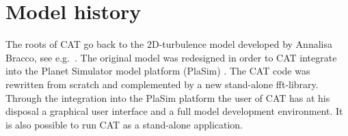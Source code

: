 \chapter{Model history}
The roots of CAT go back to the $2$D-turbulence model developed by
Annalisa Bracco, see e.g.\ \cite{braccoandmcwilliams2010}. The original
model was redesigned in order to CAT integrate into the Planet Simulator 
model platform (PlaSim) \cite{fraedrichetal1998}. The CAT code was 
rewritten from scratch \cite{borthetal2016} and complemented by a 
new stand-alone fft-library. Through the integration into the PlaSim 
platform the user of CAT has at his disposal a graphical user interface 
and a full model development environment. It is also possible to run
CAT as a stand-alone application.
